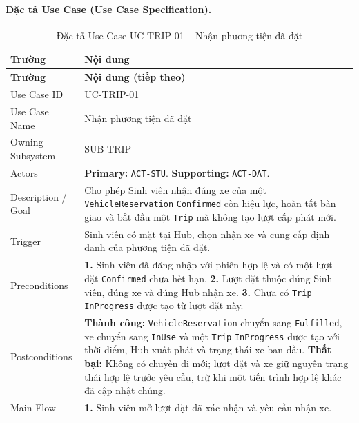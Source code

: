 \paragraph{Đặc tả Use Case (Use Case Specification).}
\small
\begin{longtable}{|L{42mm}|L{102mm}|}
  \caption{Đặc tả Use Case UC-TRIP-01 -- Nhận phương tiện đã đặt}\label{tab:spec-UC-TRIP-01}\\
  \hline
  \centering\arraybackslash\textbf{Trường} & \centering\arraybackslash\textbf{Nội dung}\\
  \hline
  \endfirsthead
  \hline
  \centering\arraybackslash\textbf{Trường} & \centering\arraybackslash\textbf{Nội dung (tiếp theo)}\\
  \hline
  \endhead
  Use Case ID & UC-TRIP-01\\\hline
  Use Case Name & Nhận phương tiện đã đặt\\\hline
  Owning Subsystem & SUB-TRIP\\\hline
  Actors & \textbf{Primary:} \texttt{ACT-STU}. \textbf{Supporting:} \texttt{ACT-DAT}.\\\hline
  Description / Goal & Cho phép Sinh viên nhận đúng xe của một \texttt{VehicleReservation} \texttt{Confirmed} còn hiệu lực, hoàn tất bàn giao và bắt đầu một \texttt{Trip} mà không tạo lượt cấp phát mới.\\\hline
  Trigger & Sinh viên có mặt tại Hub, chọn nhận xe và cung cấp định danh của phương tiện đã đặt.\\\hline
  Preconditions &
    \textbf{1.} Sinh viên đã đăng nhập với phiên hợp lệ và có một lượt đặt \texttt{Confirmed} chưa hết hạn.\newline
    \textbf{2.} Lượt đặt thuộc đúng Sinh viên, đúng xe và đúng Hub nhận xe.\newline
    \textbf{3.} Chưa có \texttt{Trip} \texttt{InProgress} được tạo từ lượt đặt này.\\\hline
  Postconditions &
    \textbf{Thành công:} \texttt{VehicleReservation} chuyển sang \texttt{Fulfilled}, xe chuyển sang \texttt{InUse} và một \texttt{Trip} \texttt{InProgress} được tạo với thời điểm, Hub xuất phát và trạng thái xe ban đầu.\newline
    \textbf{Thất bại:} Không có chuyến đi mới; lượt đặt và xe giữ nguyên trạng thái hợp lệ trước yêu cầu, trừ khi một tiến trình hợp lệ khác đã cập nhật chúng.\\\hline
  Main Flow &
    \textbf{1.} Sinh viên mở lượt đặt đã xác nhận và yêu cầu nhận xe.\newline

\end{longtable}
